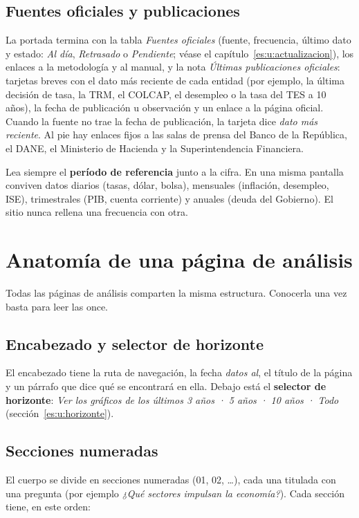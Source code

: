 \section{Fuentes oficiales y publicaciones}
La portada termina con la tabla \emph{Fuentes oficiales} (fuente, frecuencia, último dato y estado: \emph{Al
día}, \emph{Retrasado} o \emph{Pendiente}; véase el capítulo~\ref{es:u:actualizacion}), los enlaces a la
metodología y al manual, y la nota \emph{Últimas publicaciones oficiales}: tarjetas breves con el dato más
reciente de cada entidad (por ejemplo, la última decisión de tasa, la TRM, el COLCAP, el desempleo o la tasa del
TES a 10 años), la fecha de publicación u observación y un enlace a la página oficial. Cuando la fuente no trae
la fecha de publicación, la tarjeta dice \emph{dato más reciente}. Al pie hay enlaces fijos a las salas de prensa
del Banco de la República, el DANE, el Ministerio de Hacienda y la Superintendencia Financiera.

\begin{leer}
Lea siempre el \textbf{período de referencia} junto a la cifra. En una misma pantalla conviven datos diarios
(tasas, dólar, bolsa), mensuales (inflación, desempleo, ISE), trimestrales (PIB, cuenta corriente) y anuales
(deuda del Gobierno). El sitio nunca rellena una frecuencia con otra.
\end{leer}

\chapter{Anatomía de una página de análisis}
\label{es:u:anatomia}

Todas las páginas de análisis comparten la misma estructura. Conocerla una vez basta para leer las once.

\section{Encabezado y selector de horizonte}
El encabezado tiene la ruta de navegación, la fecha \emph{datos al}, el título de la página y un párrafo que
dice qué se encontrará en ella. Debajo está el \textbf{selector de horizonte}:
\emph{Ver los gráficos de los últimos 3 años · 5 años · 10 años · Todo} (sección~\ref{es:u:horizonte}).

\section{Secciones numeradas}
El cuerpo se divide en secciones numeradas (01, 02, \ldots), cada una titulada con una pregunta (por ejemplo
\emph{¿Qué sectores impulsan la economía?}). Cada sección tiene, en este orden:

